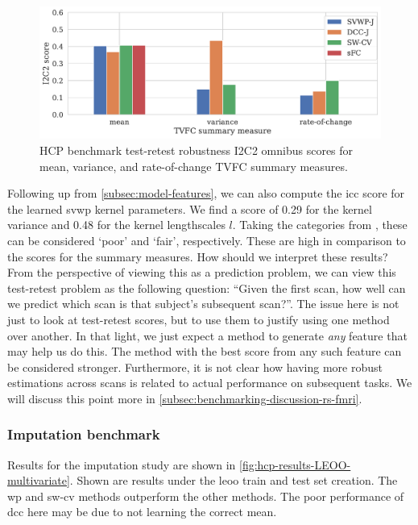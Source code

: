 \begin{figure}[t]
  \centering
  \includegraphics[width=\textwidth]{fig/hcp/d15/test_retest/I2C2/correlation_I2C2_scores}
  \caption{
    HCP benchmark test-retest robustness I2C2 omnibus scores for mean, variance, and rate-of-change TVFC summary measures.
  }\label{fig:hcp-results-test-retest-I2C2-scores-d15}
\end{figure}


Following up from \cref{subsec:model-features}, we can also compute the \gls{icc} score for the learned \gls{svwp} kernel parameters.
We find a score of 0.29 for the kernel variance and 0.48 for the kernel lengthscales $l$.
Taking the categories from \textcite{Cicchetti1994}, these can be considered `poor' and `fair', respectively.
These are high in comparison to the scores for the summary measures.
%
How should we interpret these results?
From the perspective of viewing this as a prediction problem, we can view this test-retest problem as the following question: ``Given the first scan, how well can we predict which scan is that subject's subsequent scan?''.
The issue here is not just to look at test-retest scores, but to use them to justify using one method over another.
In that light, we just expect a method to generate \emph{any} feature that may help us do this.
The method with the best score from any such feature can be considered stronger.
%
Furthermore, it is not clear how having more robust estimations across scans is related to actual performance on subsequent tasks.
We will discuss this point more in \cref{subsec:benchmarking-discussion-rs-fmri}.

\subsubsection{Imputation benchmark}

Results for the imputation study are shown in \cref{fig:hcp-results-LEOO-multivariate}.
Shown are results under the \gls{leoo} train and test set creation.
The \gls{wp} and \gls{sw-cv} methods outperform the other methods.
The poor performance of \gls{dcc} here may be due to not learning the correct mean.


